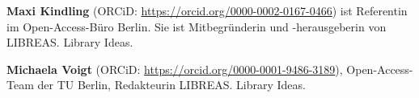 \documentclass[a4paper,
fontsize=11pt,
oneside,
numbers=noperiodatend,
parskip=half-,
bibliography=totoc,
final
]{scrartcl}
\begin{document}
\textbf{Maxi Kindling} (ORCiD:
\url{https://orcid.org/0000-0002-0167-0466}) ist Referentin im
Open-Access-Büro Berlin. Sie ist Mitbegründerin und -herausgeberin von
LIBREAS. Library Ideas.

\textbf{Michaela Voigt} (ORCiD:
\url{https://orcid.org/0000-0001-9486-3189}), Open-Access-Team der TU
Berlin, Redakteurin LIBREAS. Library Ideas.
\end{document}
